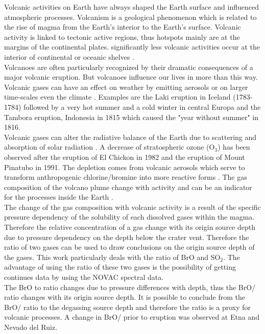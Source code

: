 
Volcanic activities on Earth have always shaped the Earth surface and influenced atmospheric processes.
Volcanism is a geological phenomenon which is related to the rise of magma from the Earth's interior to the Earth's surface. Volcanic activity is linked to tectonic active regions, thus hotspots mainly are at the margins of the continental plates.
significantly less volcanic activities occur at the interior of continental or oceanic shelves \citep{schmincke2000vulkanismus}.\\
Volcanoes are often particularly recognized by their dramatic consequences of a major volcanic eruption. But volcanoes influence our lives in more than this way. Volcanic gases can have an effect on weather by emitting aerosols or on larger time-scales even the climate \citep{schmidt2015volcanismarticle}. 
Examples are the Laki eruption in Iceland (1783-1784) followed by a very hot summer and a cold winter in central Europa \citep{thordarson2003atmospheric} and the Tambora eruption, Indonesia in 1815 which caused the "year without summer" in 1816.\\
Volcanic gases can alter the radiative balance of the Earth due to scattering and absorption of solar radiation \citep{schmidt2015volcanism}.
A decrease of stratospheric ozone (O$_3$) has been observed after the eruption of  El Chickon in 1982 and the eruption of Mount Pinatubo in 1991. The depletion comes from volcanic aerosols which serve to transform anthropogenic chlorine/bromine into more reactive forms \citep{solomon1998ozone}. 
%
\newline
%
The gas composition of the volcano plume change with activity and can be an indicator for the processes inside the Earth .\\ 
The change of the gas composition with volcanic activity is a result of the specific pressure dependency of the solubility of each dissolved gases within the magma. Therefore the relative concentration of a gas change with its origin source depth due to pressure dependency on the depth below the crater vent. Therefore the ratio of two gases can be used to draw conclusions on the origin source depth of the gases.
%
This work particularly deals with the ratio of BrO and SO$_2$. The advantage of using the ratio of these two gases is the possibility of getting continues data by using the NOVAC spectral data.\\
The BrO to  ratio changes due to pressure differences with depth, thus the BrO/ ratio changes with its origin source depth. It is possible to conclude from the BrO/ ratio to the degassing source depth and therefore the ratio is a proxy for volcanic processes. A change in BrO/ prior to eruption was observed at Etna and Nevado del Ruiz.\\
